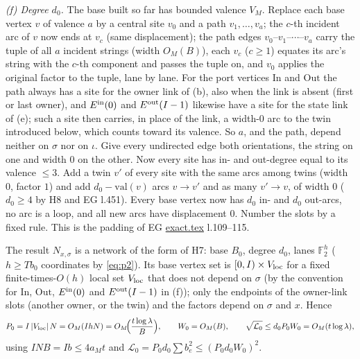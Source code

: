 \documentclass[11pt]{article}
\theoremstyle{definition}
\theoremstyle{remark}
\newcommand{\F}{\mathbb F}
\newcommand{\LL}{\mathcal L}
\newcommand{\src}[1]{\url{#1}}
\begin{document}
\emph{(f) Degree $d_0$.} The base built so far has bounded valence $V_M$. Replace each base vertex $v$ of valence $a$ by a central
site $v_0$ and a path $v_1,\dots,v_a$; the $c$-th incident arc of $v$ now ends at $v_c$ (same displacement); the path edges
$v_0$--$v_1$--$\cdots$--$v_a$ carry the tuple of all $a$ incident strings (width $O_M(B)$), each $v_c$ ($c\ge1$) equates its arc's
string with the $c$-th component and passes the tuple on, and $v_0$ applies the original factor to the tuple, lane by lane. For the
port vertices $\mathrm{In}$ and $\mathrm{Out}$ the path always has a site for the owner link of (b), also when the link is absent
(first or last owner), and $E^{\rm in}(0)$ and $E^{\rm out}(I-1)$ likewise have a site for the state link of (e); such a site then
carries, in place of the link, a width-$0$ arc to the twin introduced below, which counts toward its valence. So $a$, and the path,
depend neither on $\sigma$ nor on $\iota$. Give every undirected edge both orientations, the string on one and width $0$ on the other. Now every site has in- and
out-degree equal to its valence $\le3$. Add a twin $v'$ of every site with the same arcs among twins (width $0$, factor $1$) and add
$d_0-\mathrm{val}(v)$ arcs $v\to v'$ and as many $v'\to v$, of width $0$ ($d_0\ge4$ by H8 and EG l.451). Every base vertex now has
$d_0$ in- and $d_0$ out-arcs, no arc is a loop, and all new arcs have displacement $0$. Number the slots by a fixed rule.
This is the padding of EG \src{exact.tex} l.109--115.

The result $N_{x,\sigma}$ is a network of the form of H7: base $B_0$, degree $d_0$, lanes $\F_2^h$ ($h\ge Tb_0$ coordinates by
\eqref{eq:p2}). Its base vertex set is $[0,I)\times V_{\rm loc}$ for a fixed finite-times-$O(h)$ local set $V_{\rm loc}$ that does
not depend on $\sigma$ (by the convention for $\mathrm{In}$, $\mathrm{Out}$, $E^{\rm in}(0)$ and $E^{\rm out}(I-1)$ in (f)); only the endpoints of the owner-link slots
(another owner, or the twin) and the factors depend on $\sigma$ and $x$. Hence
\begin{equation}\label{eq:size}
 P_0=I\,|V_{\rm loc}|\,N=O_M(Ih N)=O_M\!\Bigl(\frac{t\log\lambda}{B}\Bigr),\qquad W_0=O_M(B),\qquad
 \sqrt{\LL_0}\le d_0P_0W_0=O_M(t\log\lambda),
\end{equation}
using $IN B=Ib\le4a_Mt$ and $\LL_0=P_0d_0\sum b_e^2\le(P_0d_0W_0)^2$.
\end{document}
